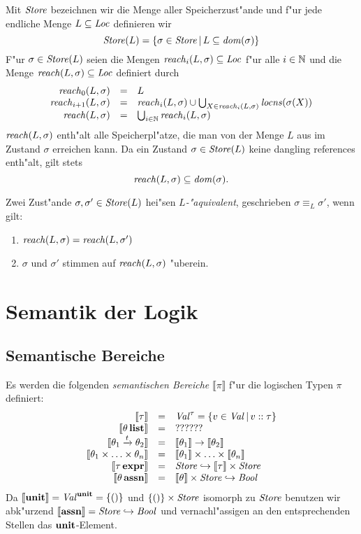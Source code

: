 \documentclass[12pt,a4paper,bigheadings]{scrartcl}
\newcommand{\semantic}[1]{\ensuremath{\llbracket#1\rrbracket}}
\newcommand{\assn}{\ensuremath{\mathbf{assn}}}
\newcommand{\atype}[1]{#1\,\assn}
\newcommand{\bexpr}{\ensuremath{\mathbf{expr}}}
\newcommand{\etype}[1]{#1\,\bexpr}
\newcommand{\locns}{\name{locns}}
\newcommand{\tto}{\ensuremath{\xrightarrow{t}}}
\begin{document}
Mit ${\text{\it Store\/}}$ bezeichnen wir die Menge aller Speicherzust"ande und f"ur jede endliche Menge
$L \subseteq {\text{\it Loc\/}}$ definieren wir
\[
  {\text{\it Store\/}}(L) = \{\sigma\in{\text{\it Store\/}}\,|\,L\subseteq{\text{\it dom\/}}(\sigma)\}
\]
F"ur $\sigma\in{\text{\it Store\/}}(L)$ seien die Mengen ${\text{\it reach\/}}_i(L,\sigma)\subseteq {\text{\it Loc\/}}$ f"ur alle
$i\in{\mathord{\mathbb N}}$ und die Menge ${\text{\it reach\/}}(L,\sigma)\subseteq{\text{\it Loc\/}}$ definiert durch
\[\begin{array}{rcl}
  \name{reach}_0(L,\sigma) & = & L \\
  \name{reach}_{i+1}(L,\sigma) & = & \name{reach}_i(L,\sigma)
             \cup \bigcup_{X\in\name{reach}_i(L,\sigma)} \locns(\sigma(X)) \\
  \name{reach}(L,\sigma) & = & \bigcup_{i\in\setN} \name{reach}_i(L,\sigma)
\end{array}\]
${\text{\it reach\/}}(L,\sigma)$ enth"alt alle Speicherpl"atze, die man von der Menge $L$ aus im
Zustand $\sigma$ erreichen kann. Da ein Zustand $\sigma\in{\text{\it Store\/}}(L)$ keine dangling references
enth"alt, gilt stets
\[
  {\text{\it reach\/}}(L,\sigma) \subseteq {\text{\it dom\/}}(\sigma).
\]

\begin{definition}[$L$-"Aquivalenz]
  Zwei Zust"ande $\sigma,\sigma'\in{\text{\it Store\/}}(L)$ hei"sen {\em $L$-"aquivalent}, geschrieben
  $\sigma \equiv_L \sigma'$, wenn gilt:
  \begin{enumerate}
    \item ${\text{\it reach\/}}(L,\sigma) = {\text{\it reach\/}}(L,\sigma')$
    \item $\sigma$ und $\sigma'$ stimmen auf ${\text{\it reach\/}}(L,\sigma)$ "uberein.
  \end{enumerate}
\end{definition}


\section{Semantik der Logik}

\subsection{Semantische Bereiche}

Es werden die folgenden {\em semantischen Bereiche} $\semantic{\pi}$ f"ur die logischen Typen $\pi$
definiert:
\[\begin{array}{rcl}
  \semantic{\tau} & = & \Val^\tau = \{v\in\Val\,|\,\tj{v}{\tau}\} \\
  \semantic{\ltype{\theta}} & = & ?????? \\
  \semantic{\theta_1 \tto \theta_2} & = & \semantic{\theta_1} \to \semantic{\theta_2} \\
  \semantic{\theta_1\times\ldots\times\theta_n}&=&\semantic{\theta_1}\times\ldots\times\semantic{\theta_n} \\
  \semantic{\etype{\tau}} & = & \Store \pto \semantic{\tau} \times \Store \\
  \semantic{\atype{\theta}} & = & \semantic{\theta} \times \Store \pto \Bool
\end{array}\]
Da $\semantic{\unit} = \Val^\unit = \{()\}$ und $\{()\}\times{\text{\it Store\/}}$ isomorph zu
${\text{\it Store\/}}$ benutzen wir abk"urzend $\semantic{\assn}=\Store\pto\Bool$ und vernachl"assigen
an den entsprechenden Stellen das $\textbf{unit}$-Element.
\end{document}
